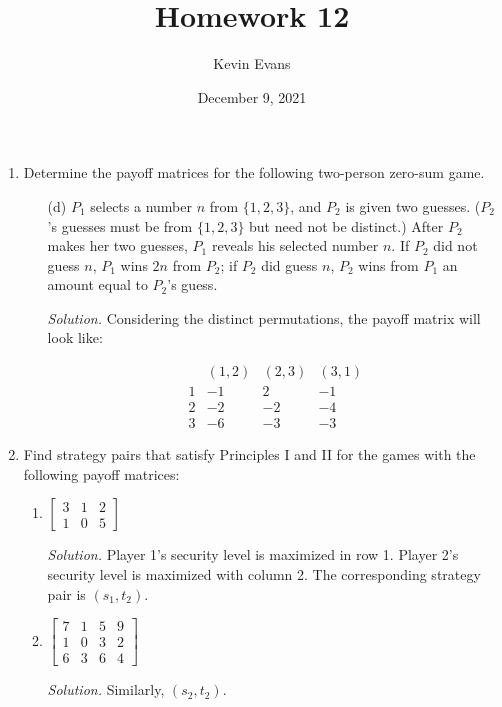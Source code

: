 \documentclass{homework}
\title{Homework 12}
\author{Kevin Evans}
\date{December 9, 2021}
\newcommand{\solution}{	\vspace{1em} \textit{Solution.} \quad }
\newcommand{\bolditem}[1][YYY]{\item[\textbf{#1}]}
\begin{document}
	\maketitle
	\begin{enumerate}
		\bolditem[9.1.1] Determine the payoff matrices for the following two-person zero-sum game. \begin{enumerate}
			\item[(d)] $P_1$ selects a number $n$ from $\{1, 2, 3\}$, and $P_2$ is given two guesses. ($P_2$'s guesses must be from $\{1, 2, 3\}$ but need not be distinct.) After $P_2$ makes her two guesses, $P_1$ reveals his selected number $n$. If $P_2$ did not guess $n$, $P_1$ wins $2n$ from $P_2$; if $P_2$ did guess $n$, $P_2$ wins from $P_1$ an amount equal to $P_2$'s guess.
			
			\solution Considering the distinct permutations, the payoff matrix will look like:
			
			$$\begin{array}{l|rrr}
				  &  (1, 2) & (2, 3)  & (3, 1) \\
				\hline
				1 & -1 & 2 & -1\\
				2 & -2 & -2 & -4 \\
				3 & -6 & -3 & -3
			\end{array}$$
		\end{enumerate}
		
		\bolditem[9.2.1] Find strategy pairs that satisfy Principles I and II for the games with the following payoff matrices: \begin{enumerate}
			\item $\begin{bmatrix}
				3 & 1 & 2 \\
				1 & 0 & 5
			\end{bmatrix}$
		
			\solution Player 1's security level is maximized in row 1. Player 2's security level is maximized with column 2. The corresponding strategy pair is $\boxed{(s_1, t_2).}$
			
			
			\item $\begin{bmatrix}
				7 & 1 & 5 & 9 \\
				1 & 0 & 3 & 2 \\
				6 & 3 & 6 & 4
			\end{bmatrix}$
			
			\solution Similarly, $\boxed{(s_2, t_2).}$
		\end{enumerate}
		

\end{enumerate}
\end{document}
